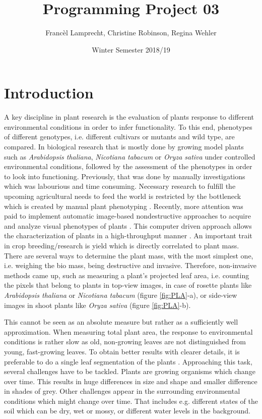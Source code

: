 \documentclass[paper=A4,bibliography=totocnumbered]{scrartcl}
\title{Programming Project 03}
\author{Francèl Lamprecht, Christine Robinson, Regina Wehler}
\date{Winter Semester 2018/19}
\begin{document}
\maketitle

\tableofcontents
\clearpage
\section{Introduction}
A key discipline in plant research is the evaluation of plants response to different environmental conditions in order to infer functionality. To this end, phenotypes of different genotypes, i.e. different cultivars or mutants and wild type, are compared. In biological research that is mostly done by growing model plants such as \textit{Arabidopsis thaliana}, \textit{Nicotiana tabacum} or \textit{Oryza sativa} under controlled environmental conditions, followed by the assessment of the phenotypes in order to look into functioning. Previously, that was done by manually investigations which was labourious and time consuming. Necessary research to fulfill the upcoming agricultural needs to feed the world is restricted by the bottleneck which is created by manual plant phenotyping \citep{Minervini.2015}. Recently, more attention was paid to implement automatic image-based nondestructive approaches to acquire and analyze visual phenotypes of plants \citep{Scharr.2016}. This computer driven approach allows the characterization of plants in a high-throughput manner \citep{Walter.2015}.
An important trait in crop breeding/research is yield which is directly correlated to plant mass. There are several ways to determine the plant mass, with the most simplest one, i.e. weighing the bio mass, being destructive and invasive. Therefore, non-invasive methods came up, such as measuring a plant's projected leaf area, i.e. counting the pixels that belong to plants in top-view images, in case of rosette plants like \textit{Arabidopsis thaliana} or \textit{Nicotiana tabacum} (figure \ref{fig:PLA}-a), or side-view images in shoot plants like \textit{Oryza sativa} (figure \ref{fig:PLA}-b). 

This cannot be seen as an absolute measure but rather as a sufficiently well approximation. When measuring total plant area, the response to environmental conditions is rather slow as old, non-growing leaves are not distinguished from young, fast-growing leaves. To obtain better results with clearer details, it is preferable to do a single leaf segmentation of the plants \citep{Scharr.2016}. Approaching this task, several challenges have to be tackled. Plants are growing organisms which change over time. This results in huge differences in size and shape and smaller difference in shades of grey. Other challenges appear in the surrounding environmental conditions which might change over time. That includes e.g. different states of the soil which can be dry, wet or mossy, or different water levels in the background. 
\end{document}
